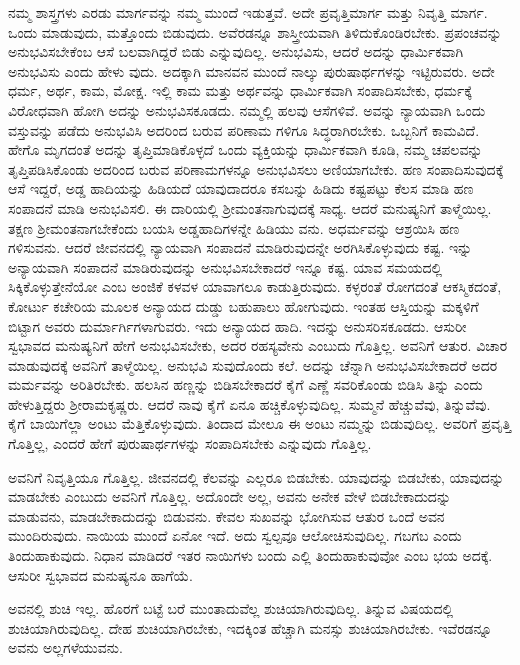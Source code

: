 ನಮ್ಮ ಶಾಸ್ತ್ರಗಳು ಎರಡು ಮಾರ್ಗವನ್ನು ನಮ್ಮ ಮುಂದೆ ಇಡುತ್ತವೆ. ಅದೇ ಪ್ರವೃತ್ತಿಮಾರ್ಗ ಮತ್ತು ನಿವೃತ್ತಿ ಮಾರ್ಗ. ಒಂದು ಮಾಡುವುದು, ಮತ್ತೊಂದು ಬಿಡುವುದು. ಅವೆರಡನ್ನೂ ಶಾಸ್ತ್ರೀಯವಾಗಿ ತಿಳಿದುಕೊಂಡಿರಬೇಕು. ಪ್ರಪಂಚವನ್ನು ಅನುಭವಿಸಬೇಕೆಂಬ ಆಸೆ ಬಲವಾಗಿದ್ದರೆ ಬಿಡು ಎನ್ನುವುದಿಲ್ಲ. ಅನುಭವಿಸು, ಆದರೆ ಅದನ್ನು ಧಾರ್ಮಿಕವಾಗಿ ಅನುಭವಿಸು ಎಂದು ಹೇಳು ವುದು. ಅದಕ್ಕಾಗಿ ಮಾನವನ ಮುಂದೆ ನಾಲ್ಕು ಪುರುಷಾರ್ಥಗಳನ್ನು ಇಟ್ಟಿರುವರು. ಅದೇ ಧರ್ಮ, ಅರ್ಥ, ಕಾಮ, ಮೋಕ್ಷ. ಇಲ್ಲಿ ಕಾಮ ಮತ್ತು ಅರ್ಥವನ್ನು ಧಾರ್ಮಿಕವಾಗಿ ಸಂಪಾದಿಸಬೇಕು, ಧರ್ಮಕ್ಕೆ ವಿರೋಧವಾಗಿ ಹೋಗಿ ಅದನ್ನು ಅನುಭವಿಸಕೂಡದು. ನಮ್ಮಲ್ಲಿ ಹಲವು ಆಸೆಗಳಿವೆ. ಅವನ್ನು ನ್ಯಾಯವಾಗಿ ಒಂದು ವಸ್ತುವನ್ನು ಪಡೆದು ಅನುಭವಿಸಿ ಅದರಿಂದ ಬರುವ ಪರಿಣಾಮ ಗಳಿಗೂ ಸಿದ್ಧರಾಗಿರಬೇಕು. ಒಬ್ಬನಿಗೆ ಕಾಮವಿದೆ. ಹೇಗೊ ಮೃಗದಂತೆ ಅದನ್ನು ತೃಪ್ತಿಮಾಡಿಕೊಳ್ಳದೆ ಒಂದು ವ್ಯಕ್ತಿಯನ್ನು ಧಾರ್ಮಿಕವಾಗಿ ಕೂಡಿ, ನಮ್ಮ ಚಪಲವನ್ನು ತೃಪ್ತಿಪಡಿಸಿಕೊಂಡು ಅದರಿಂದ ಬರುವ ಪರಿಣಾಮಗಳನ್ನೂ ಅನುಭವಿಸಲು ಅಣಿಯಾಗಬೇಕು. ಹಣ ಸಂಪಾದಿಸುವುದಕ್ಕೆ ಆಸೆ ಇದ್ದರೆ, ಅಡ್ಡ ಹಾದಿಯನ್ನು ಹಿಡಿಯದೆ ಯಾವುದಾದರೂ ಕಸಬನ್ನು ಹಿಡಿದು ಕಷ್ಟಪಟ್ಟು ಕೆಲಸ ಮಾಡಿ ಹಣ ಸಂಪಾದನೆ ಮಾಡಿ ಅನುಭವಿಸಲಿ. ಈ ದಾರಿಯಲ್ಲಿ ಶ್ರೀಮಂತನಾಗುವುದಕ್ಕೆ ಸಾಧ್ಯ. ಆದರೆ ಮನುಷ್ಯನಿಗೆ ತಾಳ್ಮೆಯಿಲ್ಲ. ತಕ್ಷಣ ಶ್ರೀಮಂತನಾಗಬೇಕೆಂದು ಬಯಸಿ ಅಡ್ಡಹಾದಿಗಳನ್ನೇ ಹಿಡಿಯು ವನು. ಅಧರ್ಮವನ್ನು ಆಶ್ರಯಿಸಿ ಹಣ ಗಳಿಸುವನು. ಆದರೆ ಜೀವನದಲ್ಲಿ ನ್ಯಾಯವಾಗಿ ಸಂಪಾದನೆ ಮಾಡಿರುವುದನ್ನೇ ಅರಗಿಸಿಕೊಳ್ಳುವುದು ಕಷ್ಟ. ಇನ್ನು ಅನ್ಯಾಯವಾಗಿ ಸಂಪಾದನೆ ಮಾಡಿರುವುದನ್ನು ಅನುಭವಿಸಬೇಕಾದರೆ ಇನ್ನೂ ಕಷ್ಟ. ಯಾವ ಸಮಯದಲ್ಲಿ ಸಿಕ್ಕಿಕೊಳ್ಳುತ್ತೇನೆಯೋ ಎಂಬ ಅಂಜಿಕೆ ಕಳವಳ ಯಾವಾಗಲೂ ಕಾಡುತ್ತಿರುವುದು. ಕಳ್ಳರಂತೆ ರೋಗದಂತೆ ಆಕಸ್ಮಿಕದಂತೆ, ಕೋರ್ಟು ಕಚೇರಿಯ ಮೂಲಕ ಅನ್ಯಾಯದ ದುಡ್ಡು ಬಹುಪಾಲು ಹೋಗುವುದು. ಇಂತಹ ಆಸ್ತಿಯನ್ನು ಮಕ್ಕಳಿಗೆ ಬಿಟ್ಟಾಗ ಅವರು ದುರ್ಮಾರ್ಗಿಗಳಾಗುವರು. ಇದು ಅನ್ಯಾಯದ ಹಾದಿ. ಇದನ್ನು ಅನುಸರಿಸಕೂಡದು. ಆಸುರೀ ಸ್ವಭಾವದ ಮನುಷ್ಯನಿಗೆ ಹೇಗೆ ಅನುಭವಿಸಬೇಕು, ಅದರ ರಹಸ್ಯವೇನು ಎಂಬುದು ಗೊತ್ತಿಲ್ಲ. ಅವನಿಗೆ ಆತುರ. ವಿಚಾರ ಮಾಡುವುದಕ್ಕೆ ಅವನಿಗೆ ತಾಳ್ಮೆಯಿಲ್ಲ. ಅನುಭವಿ ಸುವುದೊಂದು ಕಲೆ. ಅದನ್ನು ಚೆನ್ನಾಗಿ ಅನುಭವಿಸಬೇಕಾದರೆ ಅದರ ಮರ್ಮವನ್ನು ಅರಿತಿರಬೇಕು. ಹಲಸಿನ ಹಣ್ಣನ್ನು ಬಿಡಿಸಬೇಕಾದರೆ ಕೈಗೆ ಎಣ್ಣೆ ಸವರಿಕೊಂಡು ಬಿಡಿಸಿ ತಿನ್ನು ಎಂದು ಹೇಳುತ್ತಿದ್ದರು ಶ್ರೀರಾಮಕೃಷ್ಣರು. ಆದರೆ ನಾವು ಕೈಗೆ ಏನೂ ಹಚ್ಚಿಕೊಳ್ಳುವುದಿಲ್ಲ. ಸುಮ್ಮನೆ ಹೆಚ್ಚುವೆವು, ತಿನ್ನುವೆವು. ಕೈಗೆ ಬಾಯಿಗೆಲ್ಲಾ ಅಂಟು ಮೆತ್ತಿಕೊಳ್ಳುವುದು. ತಿಂದಾದ ಮೇಲೂ ಈ ಅಂಟು ನಮ್ಮನ್ನು ಬಿಡುವುದಿಲ್ಲ. ಅವರಿಗೆ ಪ್ರವೃತ್ತಿ ಗೊತ್ತಿಲ್ಲ, ಎಂದರೆ ಹೇಗೆ ಪುರುಷಾರ್ಥಗಳನ್ನು ಸಂಪಾದಿಸಬೇಕು ಎನ್ನುವುದು ಗೊತ್ತಿಲ್ಲ.

ಅವನಿಗೆ ನಿವೃತ್ತಿಯೂ ಗೊತ್ತಿಲ್ಲ. ಜೀವನದಲ್ಲಿ ಕೆಲವನ್ನು ಎಲ್ಲರೂ ಬಿಡಬೇಕು. ಯಾವುದನ್ನು ಬಿಡಬೇಕು, ಯಾವುದನ್ನು ಮಾಡಬೇಕು ಎಂಬುದು ಅವನಿಗೆ ಗೊತ್ತಿಲ್ಲ. ಅದೊಂದೇ ಅಲ್ಲ, ಅವನು ಅನೇಕ ವೇಳೆ ಬಿಡಬೇಕಾದುದನ್ನು ಮಾಡುವನು, ಮಾಡಬೇಕಾದುದನ್ನು ಬಿಡುವನು. ಕೇವಲ ಸುಖವನ್ನು ಭೋಗಿಸುವ ಆತುರ ಒಂದೆ ಅವನ ಮುಂದಿರುವುದು. ನಾಯಿಯ ಮುಂದೆ ಏನೋ ಇದೆ. ಅದು ಸ್ವಲ್ಪವೂ ಆಲೋಚಿಸುವುದಿಲ್ಲ. ಗಬಗಬ ಎಂದು ತಿಂದುಹಾಕುವುದು. ನಿಧಾನ ಮಾಡಿದರೆ ಇತರ ನಾಯಿಗಳು ಬಂದು ಎಲ್ಲಿ ತಿಂದುಹಾಕುವುವೋ ಎಂಬ ಭಯ ಅದಕ್ಕೆ. ಆಸುರೀ ಸ್ವಭಾವದ ಮನುಷ್ಯನೂ ಹಾಗೆಯೆ.

ಅವನಲ್ಲಿ ಶುಚಿ ಇಲ್ಲ. ಹೊರಗೆ ಬಟ್ಟೆ ಬರೆ ಮುಂತಾದುವೆಲ್ಲ ಶುಚಿಯಾಗಿರುವುದಿಲ್ಲ. ತಿನ್ನುವ ವಿಷಯದಲ್ಲಿ ಶುಚಿಯಾಗಿರುವುದಿಲ್ಲ. ದೇಹ ಶುಚಿಯಾಗಿರಬೇಕು, ಇದಕ್ಕಿಂತ ಹೆಚ್ಚಾಗಿ ಮನಸ್ಸು ಶುಚಿಯಾಗಿರಬೇಕು. ಇವೆರಡನ್ನೂ ಅವನು ಅಲ್ಲಗಳೆಯುವನು.

